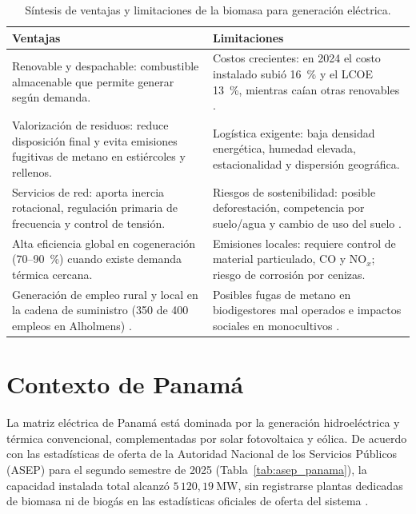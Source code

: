 \begin{table}[htbp]
\centering
\caption{Síntesis de ventajas y limitaciones de la biomasa para generación eléctrica.}
\label{tab:ventajas_limitaciones}
\begin{tabularx}{\textwidth}{@{}X X@{}}
\toprule
\textbf{Ventajas} & \textbf{Limitaciones} \\
\midrule
Renovable y despachable: combustible almacenable que permite generar según demanda. & Costos crecientes: en 2024 el costo instalado subió 16~\% y el LCOE 13~\%, mientras caían otras renovables \cite{irena2025costs}. \\
Valorización de residuos: reduce disposición final y evita emisiones fugitivas de metano en estiércoles y rellenos. & Logística exigente: baja densidad energética, humedad elevada, estacionalidad y dispersión geográfica. \\
Servicios de red: aporta inercia rotacional, regulación primaria de frecuencia y control de tensión. & Riesgos de sostenibilidad: posible deforestación, competencia por suelo/agua y cambio de uso del suelo \cite{chum2011ipcc, fao2016befs}. \\
Alta eficiencia global en cogeneración (70--90~\%) cuando existe demanda térmica cercana. & Emisiones locales: requiere control de material particulado, $\mathrm{CO}$ y $\mathrm{NO}_x$; riesgo de corrosión por cenizas. \\
Generación de empleo rural y local en la cadena de suministro (350 de 400 empleos en Alholmens) \cite{alholmenskraft}. & Posibles fugas de metano en biodigestores mal operados \cite{iea2025biogas} e impactos sociales en monocultivos \cite{er2019centroamerica}. \\
\bottomrule
\end{tabularx}
\end{table}

\section{Contexto de Panamá}
\label{sec:panama}

La matriz eléctrica de Panamá está dominada por la generación hidroeléctrica y térmica convencional, complementadas por solar fotovoltaica y eólica. De acuerdo con las estadísticas de oferta de la Autoridad Nacional de los Servicios Públicos (ASEP) para el segundo semestre de 2025 (Tabla~\ref{tab:asep_panama}), la capacidad instalada total alcanzó $5\,120{,}19~\text{MW}$, sin registrarse plantas dedicadas de biomasa ni de biogás en las estadísticas oficiales de oferta del sistema \cite{asep2025oferta}.

